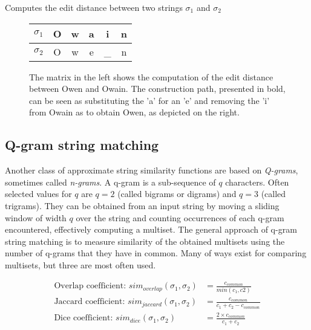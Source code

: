 \begin{algorithm}
    
    \caption{Computes the edit distance between two strings $\sigma_1$ and $\sigma_2$}
    \label{alg:edit_distance}
\end{algorithm}

\begin{figure}
    \centering
    \begin{minipage}{.65\textwidth}
        \centering
        
    \end{minipage}%
    \begin{minipage}{.35\textwidth}
        \centering
        \begin{tabular}{c||c|c|c|c|c}
            $\sigma_1$ & O & w & a & i & n \\\hline
            $\sigma_2$ & O & w & e & \_ & n
        \end{tabular}
    \end{minipage}
    \caption[Example of edit distance]{The matrix in the left shows the computation of the edit distance between Owen and Owain. The construction path, presented in bold, can be seen as substituting the 'a' for an 'e' and removing the 'i' from Owain as to obtain Owen, as depicted on the right.}
    \label{fig:edit_distance}
\end{figure}



\subsection{Q-gram string matching}
\label{subsec:qgram}

Another class of approximate string similarity functions are based on \emph{Q-grams}, sometimes called \emph{n-grams}.
A q-gram is a sub-sequence of $q$ characters.
Often selected values for $q$ are $q=2$ (called bigrams or digrams) and $q=3$ (called trigrams).
They can be obtained from an input string by moving a sliding window of width $q$ over the string and counting occurrences of each q-gram encountered, effectively computing a multiset.
The general approach of q-gram string matching is to measure similarity of the obtained multisets using the number of q-grams that they have in common.
Many of ways exist for comparing multisets, but three are most often used.

\begin{align}
    \text{Overlap coefficient: }sim_{overlap}(\sigma_1, \sigma_2) &= \frac{c_{common}}{min(c_1, c2)} \\
    \text{Jaccard coefficient: }sim_{jaccard}(\sigma_1, \sigma_2) &= \frac{c_{common}}{c_1 + c_2 - c_{common}} \\
    \text{Dice coefficient: }sim_{dice}(\sigma_1, \sigma_2) &= \frac{2 \times c_{common}}{c_1 + c_2}
\end{align}

